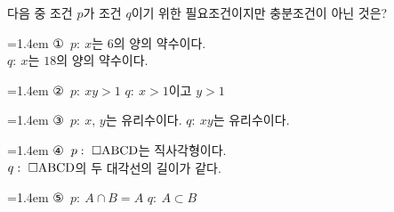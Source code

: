다음 중 조건 $p$가 조건 $q$이기 위한 필요조건이지만 충분조건이 아닌 것은? 
\par\medskip\par\noindent\hangindent=1.4em {\small ①}\ $p:\ x$는 $6$의 양의 약수이다.\\ $q:\ x$는 $18$의 양의 약수이다.\par\noindent\hangindent=1.4em {\small ②}\ $p:\ xy>1$ \hspace{3em} $q:\ x>1$이고 $y>1$\par\noindent\hangindent=1.4em {\small ③}\ $p:\ x$, $y$는 유리수이다. \hspace{3em} $q:\ xy$는 유리수이다.\par\noindent\hangindent=1.4em {\small ④}\ $p:\ \square\pt{ABCD}$는 직사각형이다.\\ $q:\ \square\mathrm{ABCD}$의 두 대각선의 길이가 같다.\par\noindent\hangindent=1.4em {\small ⑤}\ $p:\ A\cap B=A$ \hspace{3em} $q:\ A\subset B$\par\medskip
